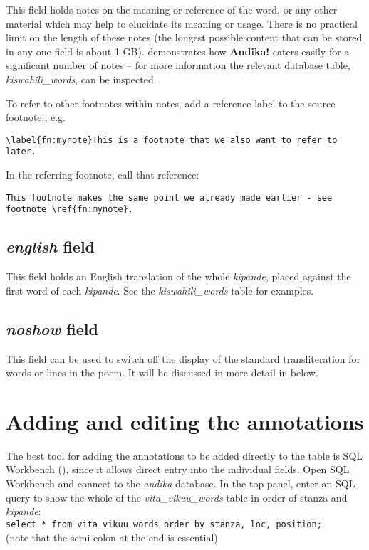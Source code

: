 This field holds notes on the meaning or reference of the word, or any other material which may help to elucidate its meaning or usage.  There is no practical limit on the length of these notes (the longest possible content that can be stored in any one field is about 1 GB).   demonstrates how \textbf{Andika!} caters easily for a significant number of notes -- for more information the relevant database table, \textit{kiswahili_words}, can be inspected.

To refer to other footnotes within notes, add a reference label to the source footnote:, e.g.

\verb|\label{fn:mynote}This is a footnote that we also want to refer to later.|

In the referring footnote, call that reference:

\verb|This footnote makes the same point we already made earlier - see footnote \ref{fn:mynote}.|

\subsection{\textit{english} field}

This field holds an English translation of the whole \textit{kipande}, placed against the first word of each \textit{kipande}.  See the \textit{kiswahili_words} table for examples.

\subsection{\textit{noshow} field}
\label{ss:noshow}

This field can be used to switch off the display of the standard transliteration for words or lines in the poem.  It will be discussed in more detail in  below.


\section{Adding and editing the annotations}

The best tool for adding the annotations to be added directly to the table is SQL Workbench (), since it allows direct entry into the individual fields.  Open SQL Workbench and connect to the \textit{andika} database.  In the top panel, enter an SQL query to show the whole of the \textit{vita_vikuu_words} table in order of stanza and \textit{kipande}:\\
\verb|select * from vita_vikuu_words order by stanza, loc, position;|\\
(note that the semi-colon at the end is essential)

